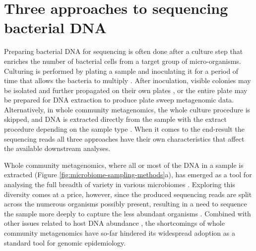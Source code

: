 \documentclass[officiallayout]{tktla}
\begin{document}
\section{Three approaches to sequencing bacterial DNA}
\label{three-approaches-to-metagenomics}


Preparing bacterial DNA for sequencing is often done after a culture
step that enriches the number of bacterial cells from a target group
of micro-organisms. Culturing is performed by plating a sample and
inoculating it for a period of time that allows the bacteria to
multiply \citep{sanders2012aseptic}. After inoculation, visible
colonies may be isolated and further propagated on their own plates
\citep{sanders2012aseptic}, or the entire plate may be prepared for DNA
extraction to produce plate sweep metagenomic data. Alternatively, in
whole community metagenomics, the whole culture procedure is skipped, and DNA is
extracted directly from the sample with the extract procedure
depending on the sample type \citep{bachmann2018advances}. When it
comes to the end-result \textemdash{ } the sequencing reads
\textemdash{ } all three approaches have their own characteristics
that affect the available downstream analyses.

Whole community metagenomics, where all or most of the DNA in a sample is
extracted (Figure \ref{fig:microbiome-sampling-methods}a), has emerged
as a tool for analysing the full breadth of variety in various
microbiomes \citep{shao2019stunted, ghensi2020strong,
  bertrand2019hybrid, danko2021global, whelan2020culture}. Exploring
this diversity comes at a price, however, since the produced
sequencing reads are split across the numerous organisms possibly
present, resulting in a need to sequence the sample more deeply to
capture the less abundant organisms \citep{whelan2020culture,
  vollmers2017comparing, quince2017shotgun}. Combined with other
issues related to host DNA abundance \citep{whelan2020culture, ivy2018direct, gu2019clinical}, the shortcomings of whole community metagenomics have
so-far hindered its widespread adoption as a standard tool for
genomic epidemiology.
\end{document}
